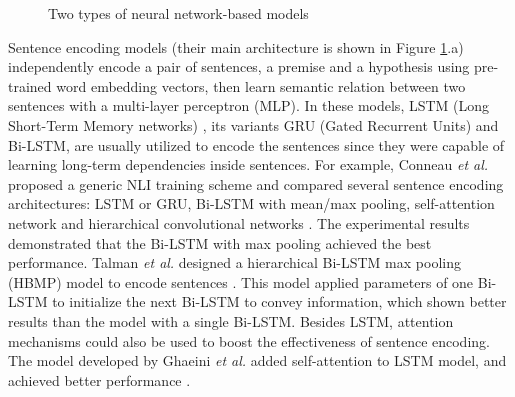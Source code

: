 \documentclass[10pt,sigconf]{acmart}
\begin{document}
\begin{figure}[h]
    \centering

    \caption{Two types of neural network-based models}
    \label{fig:different type model}
\end{figure}

Sentence encoding models \cite{conneau2017supervised,talman2018natural,im2017distance,shen2018reinforced} (their main architecture is shown in Figure \ref{fig:different type model}.a) independently encode a pair of sentences, a premise and a hypothesis using pre-trained word embedding vectors, then learn semantic relation between two sentences with a multi-layer perceptron (MLP). In these models, LSTM (Long Short-Term Memory networks) \cite{cheng2016long}, its variants GRU (Gated Recurrent Units) \cite{chung2014empirical} and Bi-LSTM, are usually utilized to encode the sentences since they were capable of learning long-term dependencies inside sentences. For example, Conneau {\it et al.} proposed a generic NLI training scheme and compared several sentence encoding architectures: LSTM or GRU, Bi-LSTM with mean/max pooling, self-attention network and hierarchical convolutional networks \cite{conneau2017supervised}. The experimental results demonstrated that the Bi-LSTM with max pooling achieved the best performance. Talman {\it et al.} designed a hierarchical Bi-LSTM max pooling (HBMP) model to encode sentences \cite{talman2018natural}. This model applied parameters of one Bi-LSTM to initialize the next Bi-LSTM to convey information, which shown better results than the model with a single Bi-LSTM. Besides LSTM, attention mechanisms could also be used to boost the effectiveness of sentence encoding. The model developed by Ghaeini {\it et al.} added self-attention to LSTM model, and achieved better performance \cite{ghaeini2018dr}.
\end{document}
